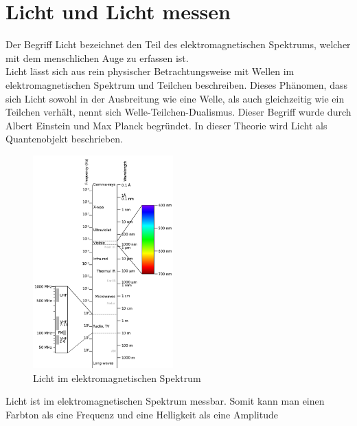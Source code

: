 \documentclass[11pt]{scrartcl}
\begin{document}
\section{Licht und Licht messen} \label{light and measurement}
Der Begriff Licht bezeichnet den Teil des elektromagnetischen Spektrums, welcher mit dem menschlichen Auge zu erfassen ist.\\
Licht lässt sich aus rein physischer Betrachtungsweise mit Wellen im elektromagnetischen Spektrum und Teilchen beschreiben. Dieses Phänomen,
dass sich Licht sowohl in der Ausbreitung wie eine Welle, als auch gleichzeitig wie ein Teilchen verhält, nennt sich
Welle-Teilchen-Dualismus. Dieser Begriff wurde durch Albert Einstein und Max Planck begründet. In dieser Theorie wird Licht als
Quantenobjekt beschrieben. \cite{wikiLicht}\\
\begin{figure}
    \vspace{-25pt}
    \begin{center}
        \includegraphics[width=0.48\textwidth]{images/Elektromagnetisches-Spektrum.png}
    \end{center}
    \vspace{-20pt}
    \captionsetup{justification=raggedright,singlelinecheck=false}
    \caption[Licht im elektromagnetischen Spektrum]{Licht im elektromagnetischen Spektrum \cite{spectrumLight}}
    \vspace{-15pt}
\end{figure}
\noindent
Licht ist im elektromagnetischen Spektrum messbar. Somit kann man einen Farbton als eine Frequenz und eine Helligkeit als eine Amplitude
\end{document}
